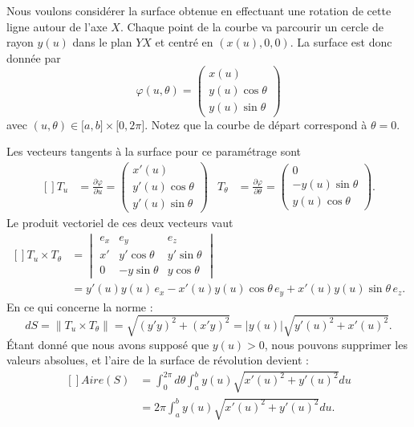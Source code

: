 Nous voulons considérer la surface obtenue en effectuant une rotation de cette ligne autour de l'axe \( X\). Chaque point de la courbe va parcourir un cercle de rayon \( y(u)\) dans le plan \( YX\) et centré en \( (x(u),0,0)\). La surface est donc donnée par
\begin{equation}
	\varphi(u,\theta)=\begin{pmatrix}
		x(u)           \\
		y(u)\cos\theta \\
		y(u)\sin\theta
	\end{pmatrix}
\end{equation}
avec \( (u,\theta)\in\mathopen[ a , b \mathclose]\times \mathopen[ 0 , 2\pi \mathclose]\). Notez que la courbe de départ correspond à \( \theta=0\).

Les vecteurs tangents à la surface pour ce paramétrage sont
\begin{equation}
	\begin{aligned}[]
		T_u        & =\frac{ \partial \varphi }{ \partial u }=\begin{pmatrix}
			x'(u)           \\
			y'(u)\cos\theta \\
			y'(u)\sin\theta
		\end{pmatrix}       &
		T_{\theta} & =\frac{ \partial \varphi }{ \partial \theta }=\begin{pmatrix}
			0               \\
			-y(u)\sin\theta \\
			y(u)\cos\theta
		\end{pmatrix}.
	\end{aligned}
\end{equation}
Le produit vectoriel de ces deux vecteurs vaut
\begin{equation}
	\begin{aligned}[]
		T_u\times T_{\theta} & =\begin{vmatrix}
			e_x & e_y          & e_z          \\
			x'  & y'\cos\theta & y'\sin\theta \\
			0   & -y\sin\theta & y\cos\theta
		\end{vmatrix}                                          \\
		                     & =y'(u)y(u)\,e_x-x'(u)y(u)\cos\theta\, e_y+x'(u)y(u)\sin\theta\, e_z.
	\end{aligned}
\end{equation}
En ce qui concerne la norme :
\begin{equation}
	dS=\| T_u\times T_{\theta} \|=\sqrt{(y'y)^2+(x'y)^2}=| y(u) |\sqrt{y'(u)^2+x'(u)^2}.
\end{equation}
Étant donné que nous avons supposé que \( y(u)>0\), nous pouvons supprimer les valeurs absolues, et l'aire de la surface de révolution devient :
\begin{equation}
	\begin{aligned}[]
		Aire(S) & =\int_0^{2\pi}d\theta\int_a^b y(u)\sqrt{x'(u)^2+y'(u)^2}du \\
		        & =2\pi\int_a^b y(u)\sqrt{x'(u)^2+y'(u)^2}du.
	\end{aligned}
\end{equation}

